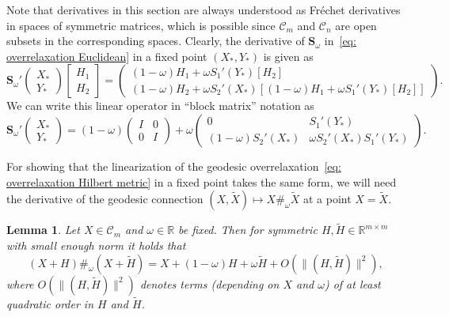 \documentclass[a4paper]{article}
\newcommand{\R}{\mathbb{R}}
\newcommand{\bS}{\mathbf{S}}
\newcommand{\caC}{\mathcal{C}}
\newtheorem{lemma}[theorem]{Lemma}
\theoremstyle{definition}
\numberwithin{equation}{section}
\begin{document}
Note that derivatives in this section are always understood as Fr\'echet derivatives in spaces of symmetric matrices, which is possible since $\caC_m$ and $\caC_{n}$ are open subsets in the corresponding spaces. Clearly, the derivative of $\bS_\omega$ in~\eqref{eq: overrelaxation Euclidean} in a fixed point $(X_*,Y_*)$ is given as
\[
 \bS_\omega'\!\begin{pmatrix} X_* \\ Y_* \end{pmatrix}\begin{bmatrix} H_1 \\ H_2 \end{bmatrix} = \begin{pmatrix} (1-\omega) H_1 + \omega S_1'(Y_*)[H_2] \\ (1-\omega) H_2 + \omega S_2'(X_*)[(1-\omega) H_1 + \omega S_1'(Y_*)[H_2]] \end{pmatrix}.
\]
We can write this linear operator in ``block matrix'' notation as
\begin{equation}\label{eq: derivative block notation}
 \bS_\omega'\!\begin{pmatrix} X_* \\ Y_* \end{pmatrix} = (1-\omega) \begin{pmatrix} I & 0 \\ 0 & I \end{pmatrix} + \omega  \begin{pmatrix} 0 & S_1'(Y_*) \\ (1-\omega) S_2'(X_*) & \omega S_2'(X_*) S_1'(Y_*) \end{pmatrix}.
\end{equation}

For showing that the linearization of the geodesic overrelaxation~\eqref{eq: overrelaxation Hilbert metric} in a fixed point takes the same form, we will need the derivative of the geodesic connection $(X,\tilde X) \mapsto X \#_\omega \tilde X$ at a point $X = \tilde X$.

\begin{lemma}\label{lem: derivative of geodesic}
Let $X \in \caC_{m}$ and $\omega \in \mathbb R$ be fixed. Then for symmetric $H, \tilde H \in \R^{m \times m}$ with small enough norm it holds that
\[
 (X+H)\#_{\omega} (X+\tilde H) = X + (1-\omega)H + \omega \tilde H + O(\| (H,\tilde H) \|^2),
\]
where $O(\|(H,\tilde H)\|^2)$ denotes terms (depending on $X$ and $\omega$) of at least quadratic order in $H$ and $\tilde H$.
\end{lemma}
\end{document}
